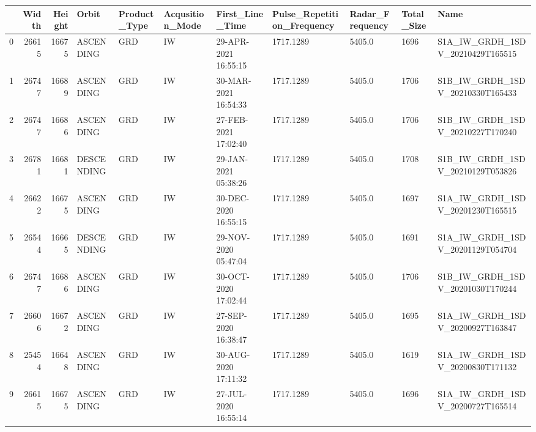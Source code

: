 \begin{tabular}{lrrllllllll}
\toprule
{} &  Width &  Height &       Orbit & Product\_Type & Acqusition\_Mode &       First\_Line\_Time & Pulse\_Repetition\_Frequency & Radar\_Frequency & Total\_Size &                              Name \\
\midrule
0   &  26615 &   16675 &   ASCENDING &          GRD &              IW &  29-APR-2021 16:55:15 &                  1717.1289 &          5405.0 &       1696 &  S1A\_IW\_GRDH\_1SDV\_20210429T165515 \\
1   &  26747 &   16689 &   ASCENDING &          GRD &              IW &  30-MAR-2021 16:54:33 &                  1717.1289 &          5405.0 &       1706 &  S1B\_IW\_GRDH\_1SDV\_20210330T165433 \\
2   &  26747 &   16686 &   ASCENDING &          GRD &              IW &  27-FEB-2021 17:02:40 &                  1717.1289 &          5405.0 &       1706 &  S1B\_IW\_GRDH\_1SDV\_20210227T170240 \\
3   &  26781 &   16681 &  DESCENDING &          GRD &              IW &  29-JAN-2021 05:38:26 &                  1717.1289 &          5405.0 &       1708 &  S1B\_IW\_GRDH\_1SDV\_20210129T053826 \\
4   &  26622 &   16675 &   ASCENDING &          GRD &              IW &  30-DEC-2020 16:55:15 &                  1717.1289 &          5405.0 &       1697 &  S1A\_IW\_GRDH\_1SDV\_20201230T165515 \\
5   &  26544 &   16665 &  DESCENDING &          GRD &              IW &  29-NOV-2020 05:47:04 &                  1717.1289 &          5405.0 &       1691 &  S1A\_IW\_GRDH\_1SDV\_20201129T054704 \\
6   &  26747 &   16686 &   ASCENDING &          GRD &              IW &  30-OCT-2020 17:02:44 &                  1717.1289 &          5405.0 &       1706 &  S1B\_IW\_GRDH\_1SDV\_20201030T170244 \\
7   &  26606 &   16672 &   ASCENDING &          GRD &              IW &  27-SEP-2020 16:38:47 &                  1717.1289 &          5405.0 &       1695 &  S1A\_IW\_GRDH\_1SDV\_20200927T163847 \\
8   &  25454 &   16648 &   ASCENDING &          GRD &              IW &  30-AUG-2020 17:11:32 &                  1717.1289 &          5405.0 &       1619 &  S1A\_IW\_GRDH\_1SDV\_20200830T171132 \\
9   &  26615 &   16675 &   ASCENDING &          GRD &              IW &  27-JUL-2020 16:55:14 &                  1717.1289 &          5405.0 &       1696 &  S1A\_IW\_GRDH\_1SDV\_20200727T165514 \\

\end{tabular}
